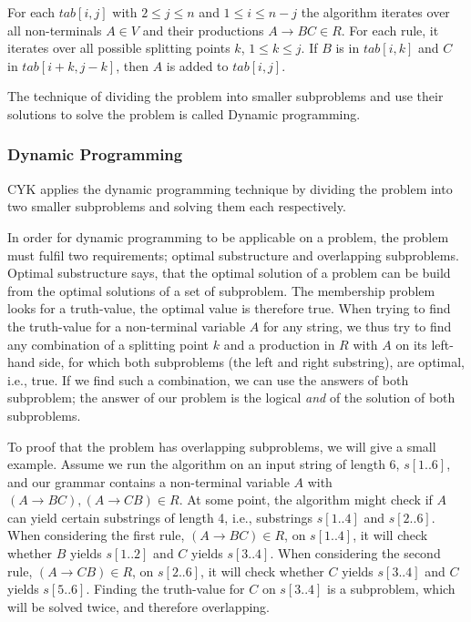 For each $tab[i,j]$ with $2\leq j \leq n$ and $1\leq i \le n-j$ the algorithm iterates over all non-terminals $A\in V$ and their productions $A\rightarrow BC \in R$.
For each rule, it iterates over all possible splitting points $k$, $1\leq k\le j$.
If $B$ is in $tab[i, k]$ and $C$ in $tab[i+k,j-k]$, then $A$ is added to $tab[i,j]$.

The technique of dividing the problem into smaller subproblems and use their solutions to solve the problem is called Dynamic programming.

\subsubsection{Dynamic Programming}

CYK applies the dynamic programming technique by dividing the problem into two smaller subproblems and solving them each respectively.

In order for dynamic programming to be applicable on a problem, the problem must fulfil two requirements; optimal substructure and overlapping subproblems.
Optimal substructure says, that the optimal solution of a problem can be build from the optimal solutions of a set of subproblem. 
The membership problem looks for a truth-value, the optimal value is therefore true.
When trying to find the truth-value for a non-terminal variable $A$ for any string, we thus try to find any combination of a splitting point $k$ and a production in $R$ with $A$ on its left-hand side, for which both subproblems (the left and right substring), are optimal, i.e., true.
If we find such a combination, we can use the answers of both subproblem; the answer of our problem is the logical \textit{and} of the solution of both subproblems.

To proof that the problem has overlapping subproblems, we will give a small example.
Assume we run the algorithm on an input string of length 6, $s[1..6]$, and our grammar contains a non-terminal variable $A$ with $(A\rightarrow BC), (A\rightarrow CB)\in R$.
At some point, the algorithm might check if $A$ can yield certain substrings of length 4, i.e., substrings $s[1..4]$ and $s[2..6]$.
When considering the first rule, $(A\rightarrow BC)\in R$, on $s[1..4]$, it will check whether $B$ yields $s[1..2]$ and $C$ yields $s[3..4]$.
When considering the second rule, $(A\rightarrow CB)\in R$, on $s[2..6]$, it will check whether $C$ yields $s[3..4]$ and $C$ yields $s[5..6]$.
Finding the truth-value for $C$ on $s[3..4]$ is a subproblem, which will be solved twice, and therefore overlapping.

